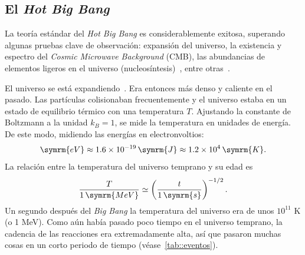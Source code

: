 \subsection{El \textit{Hot Big Bang}}
La teoría estándar del \textit{Hot Big Bang} es considerablemente exitosa, superando algunas pruebas clave de observación: expansión del universo, la existencia y espectro del \textit{Cosmic Microwave Background} (CMB), las abundancias de elementos ligeros en el universo (nucleosíntesis)~\cite{gamow1946expanding,alpher1948evolution,alpher1953physical}, entre otras~\cite{liddle1998introduction}.

El universo se está expandiendo~\cite{hubble1929relation}. Era entonces más denso y caliente en el pasado. Las partículas colisionaban frecuentemente y el universo estaba en un estado de equilibrio térmico con una temperatura \(T\). Ajustando la constante de Boltzmann a la unidad \(k_B=1\), se mide la temperatura en unidades de energía. De este modo, midiendo las energías en electronvoltios:
\begin{equation}
    \symrm{eV}\approx 1.6\times 10^{-19}\,\symrm{J}\approx 1.2\times 10^{4}\,\symrm{K}.
\end{equation}
La relación entre la temperatura del universo temprano y su edad es~\cite{baumann2022cosmology}
\begin{equation}
    \frac{T}{1\,\symrm{MeV}}\simeq \left(\frac{t}{1\,\symrm{s}}\right)^{-1/2}.
\end{equation}
Un segundo después del \textit{Big Bang} la temperatura del universo era de unos \(10^{11}\) K (o 1 MeV). Como aún había pasado poco tiempo en el universo temprano, la cadencia de las reacciones era extremadamente alta, así que pasaron muchas cosas en un corto periodo de tiempo (véase~\autoref{tab::eventos}).
